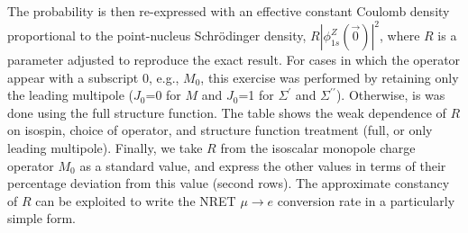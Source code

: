 \documentclass{book}[letterpaper,12pt]
\begin{document}
\begin{table}
{  The probability is then re-expressed with an effective constant Coulomb density proportional to the point-nucleus Schr\"{o}dinger density, $R |\phi_{1s}^Z(\vec{0})|^2$, where $R$ is a parameter adjusted to 
  reproduce the exact result.  For cases in which the operator appear with a subscript 0, e.g., $M_0$, this exercise was performed
  by retaining only the leading multipole ($J_0$=0 for $M$ and $J_0$=1 for $\Sigma^\prime$ and $\Sigma^{\prime \prime}$).  Otherwise, is was done using the full
  structure function.  The table shows the weak dependence of $R$ on isospin, choice of operator, and structure function treatment (full, or only leading multipole).  Finally, we take $R$
  from the isoscalar monopole charge operator $M_0$ as a standard value, and express the other values in terms of their percentage deviation from this value (second rows).   The approximate constancy
  of $R$ can be exploited to write the NRET $\mu \rightarrow e$ conversion rate in a particularly simple form.}
\end{table}
\end{document}
